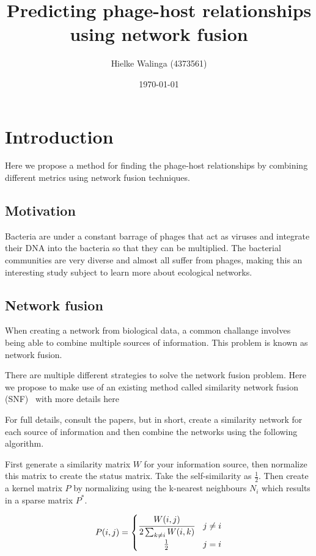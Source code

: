\documentclass{article}
\title{Predicting phage-host relationships using network fusion}
\author{Hielke Walinga (4373561)}
\date{\today}
\begin{document}
\maketitle

\section{Introduction}

Here we propose a method for finding the phage-host relationships 
by combining different metrics using network fusion techniques.

\subsection{Motivation}

Bacteria are under a constant barrage of phages that act as viruses and
integrate their DNA into the bacteria so that they can be multiplied. 
The bacterial communities are very diverse and almost all suffer from
phages, making this an interesting study subject to learn more about
ecological networks.

\subsection{Network fusion}

When creating a network from biological data, a common challange involves
being able to combine multiple sources of information. This problem is
known as network fusion. 

There are multiple different strategies to solve the network fusion problem. 
Here we propose to make use of an existing method called 
similarity network fusion (SNF)~\cite{wang2014similarity}
with more details here~\cite{wang2012unsupervised}

For full details, consult the papers, but in short, create a similarity network
for each source of information and then combine the networks using the 
following algorithm.

First generate a similarity matrix $W$ for your information source, 
then normalize this matrix to create the status matrix. Take the 
self-similarity as $\frac{1}{2}$. Then create
a kernel matrix $P$ by normalizing using the k-nearest neighbours $N_i$ which 
results in a sparse matrix $P^*$.

\begin{equation}
    P(i, j) = 
    \begin{cases}
        \cfrac{W(i, j)}{2 \sum_{k \neq i}W(i, k)} & j \neq i \\
        \hfil \frac{1}{2} & j = i
    \end{cases}
\end{equation}
\end{document}
